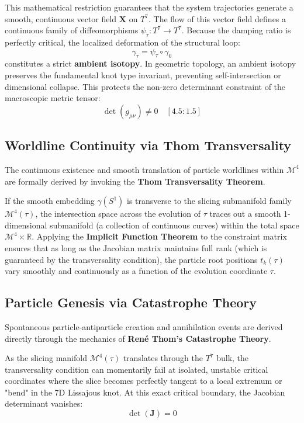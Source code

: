 \documentclass[12pt,letterpaper]{article}
\theoremstyle{definition}
\begin{document}
This mathematical restriction guarantees that the system trajectories generate a smooth, continuous vector field $\mathbf{X}$ on $T^7$. The flow of this vector field defines a continuous family of diffeomorphisms $\psi_\tau: T^7 \to T^7$. Because the damping ratio is perfectly critical, the localized deformation of the structural loop:
\begin{equation}
    \gamma_\tau = \psi_\tau \circ \gamma_0
\end{equation}
constitutes a strict \textbf{ambient isotopy}. In geometric topology, an ambient isotopy preserves the fundamental knot type invariant, preventing self-intersection or dimensional collapse. This protects the non-zero determinant constraint of the macroscopic metric tensor:
\begin{equation}
    \det(g_{\mu\nu}) \neq 0 \quad [4.5 : 1.5]
\end{equation}

\subsection{Worldline Continuity via Thom Transversality}
The continuous existence and smooth translation of particle worldlines within $\mathcal{M}^4$ are formally derived by invoking the \textbf{Thom Transversality Theorem}. 

If the smooth embedding $\gamma(S^1)$ is transverse to the slicing submanifold family $\mathcal{M}^4(\tau)$, the intersection space across the evolution of $\tau$ traces out a smooth 1-dimensional submanifold (a collection of continuous curves) within the total space $\mathcal{M}^4 \times \mathbb{R}$. Applying the \textbf{Implicit Function Theorem} to the constraint matrix ensures that as long as the Jacobian matrix maintains full rank (which is guaranteed by the transversality condition), the particle root positions $t_k(\tau)$ vary smoothly and continuously as a function of the evolution coordinate $\tau$.

\subsection{Particle Genesis via Catastrophe Theory}
Spontaneous particle-antiparticle creation and annihilation events are derived directly through the mechanics of \textbf{René Thom's Catastrophe Theory}. 

As the slicing manifold $\mathcal{M}^4(\tau)$ translates through the $T^7$ bulk, the transversality condition can momentarily fail at isolated, unstable critical coordinates where the slice becomes perfectly tangent to a local extremum or "bend" in the 7D Lissajous knot. At this exact critical boundary, the Jacobian determinant vanishes:
\begin{equation}
    \det(\mathbf{J}) = 0
\end{equation}
\end{document}
